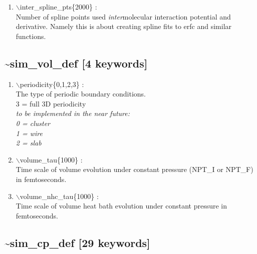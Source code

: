 \documentclass[12pt,titlepage]{article}
\begin{document}
\begin{enumerate}
 \vspace{0.15in} 
 \item   $\backslash$inter\_spline\_pts\{2000\} : \\
    Number of spline points used {\it inter}molecular interaction 
    potential and derivative.  Namely this is about creating spline fits to erfc and similar functions.

\end{enumerate}

\newpage
\subsection*{\bf \~{}sim\_vol\_def [4 keywords]}

\begin{enumerate}

\vspace{0.15in} 
 \item  $\backslash$periodicity\{0,1,2,3\} : \\
       The type of periodic boundary conditions.\\
	3 = full 3D periodicity\\
	{\it to be implemented in the near future:\\
       0 = cluster\\
       1 = wire\\
       2 = slab}


 \vspace{0.15in} 
 \item  $\backslash$volume\_tau\{1000\} : \\
     Time scale of volume evolution
     under constant pressure (NPT\_I or NPT\_F) in femtoseconds.
  
 \vspace{0.15in} 
 \item  $\backslash$volume\_nhc\_tau\{1000\} : \\
     Time scale of volume 
     heat bath evolution under constant pressure in femtoseconds.

\end{enumerate}

\newpage
\subsection*{\bf \~{}sim\_cp\_def [29 keywords]}
\end{document}
